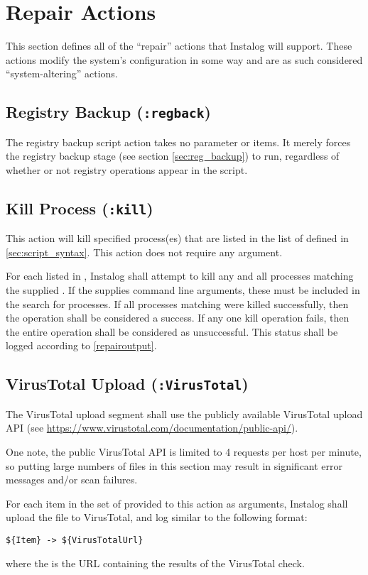 \section{Repair Actions} \label{sec:repair_actions}
This section defines all of the ``repair'' actions that Instalog will support. 
These actions modify the system's configuration in some way and are as such
considered ``system-altering'' actions. \label{systemaltering}

\subsection{Registry Backup (\texttt{:regback})}
The registry backup script action takes no parameter or items. It merely forces
the registry backup stage (see section \ref{sec:reg_backup}) to run, regardless
of whether or not registry operations appear in the script.

\subsection{Kill Process (\texttt{:kill})}
This action will kill specified process(es) that are listed in the list of
 defined in \ref{sec:script_syntax}.  This action does not require
any argument.  

For each  listed in , Instalog shall attempt to kill any
and all processes matching the supplied .  If the 
supplies command line arguments, these must be included in the search for
processes.  If all processes matching  were killed successfully,
then the operation shall be considered a success.  If any one kill operation
fails, then the entire operation shall be considered as unsuccessful.  This
status shall be logged according to \ref{repairoutput}.

\subsection{VirusTotal Upload (\texttt{:VirusTotal})}
The VirusTotal upload segment shall use the publicly available VirusTotal
upload API (see \url{https://www.virustotal.com/documentation/public-api/}).

One note, the public VirusTotal API is limited to 4 requests per host per
minute, so putting large numbers of files in this section may result in
significant error messages and/or scan failures.

For each item in the set of  provided to this action as arguments,
Instalog shall upload the file to VirusTotal, and log similar to the following
format:
\begin{verbatim}
${Item} -> ${VirusTotalUrl}
\end{verbatim}
where the  is the URL containing the results of the
VirusTotal check.

